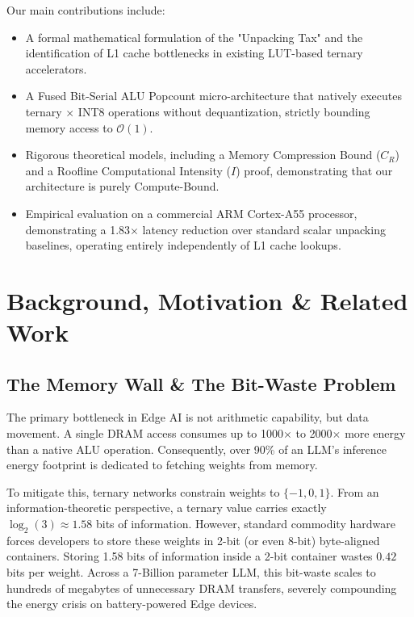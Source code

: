 \documentclass[10pt, conference]{IEEEtran}
\begin{document}
Our main contributions include:
\begin{itemize}
    \item A formal mathematical formulation of the "Unpacking Tax" and the identification of L1 cache bottlenecks in existing LUT-based ternary accelerators.
    \item A Fused Bit-Serial ALU Popcount micro-architecture that natively executes ternary $\times$ INT8 operations without dequantization, strictly bounding memory access to $\mathcal{O}(1)$.
    \item Rigorous theoretical models, including a Memory Compression Bound ($C_R$) and a Roofline Computational Intensity ($I$) proof, demonstrating that our architecture is purely Compute-Bound.
    \item Empirical evaluation on a commercial ARM Cortex-A55 processor, demonstrating a 1.83$\times$ latency reduction over standard scalar unpacking baselines, operating entirely independently of L1 cache lookups.
\end{itemize}






\section{Background, Motivation \& Related Work}

\subsection{The Memory Wall \& The Bit-Waste Problem}
The primary bottleneck in Edge AI is not arithmetic capability, but data movement. A single DRAM access consumes up to 1000$\times$ to 2000$\times$ more energy than a native ALU operation. Consequently, over 90\% of an LLM's inference energy footprint is dedicated to fetching weights from memory. 

To mitigate this, ternary networks constrain weights to $\{-1, 0, 1\}$. From an information-theoretic perspective, a ternary value carries exactly $\log_2(3) \approx 1.58$ bits of information. However, standard commodity hardware forces developers to store these weights in 2-bit (or even 8-bit) byte-aligned containers. Storing 1.58 bits of information inside a 2-bit container wastes $0.42$ bits per weight. Across a 7-Billion parameter LLM, this bit-waste scales to hundreds of megabytes of unnecessary DRAM transfers, severely compounding the energy crisis on battery-powered Edge devices.
\end{document}
